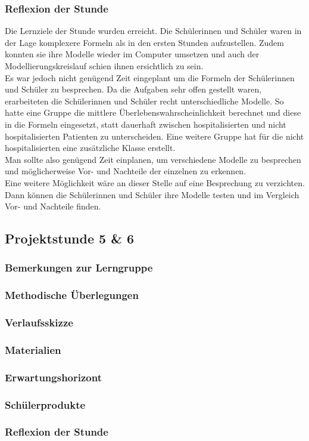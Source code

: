 \subsubsection{Reflexion der Stunde}
Die Lernziele der Stunde wurden erreicht. Die Schülerinnen und Schüler waren in der Lage komplexere Formeln als in den ersten Stunden aufzustellen. Zudem konnten sie ihre Modelle wieder im Computer umsetzen und auch der Modellierungskreislauf schien ihnen ersichtlich zu sein.\\
Es war jedoch nicht genügend Zeit eingeplant um die Formeln der Schülerinnen und Schüler zu besprechen. Da die Aufgaben sehr offen gestellt waren, erarbeiteten die Schülerinnen und Schüler recht unterschiedliche Modelle. So hatte eine Gruppe die mittlere Überlebenswahrscheinlichkeit berechnet und diese in die Formeln eingesetzt, statt dauerhaft zwischen hospitalisierten und nicht hospitalisierten Patienten zu unterscheiden. Eine weitere Gruppe hat für die nicht hospitalisierten eine zusätzliche Klasse erstellt.\\
Man sollte also genügend Zeit einplanen, um verschiedene Modelle zu besprechen und möglicherweise Vor- und Nachteile der einzelnen zu erkennen.\\
Eine weitere Möglichkeit wäre an dieser Stelle auf eine Besprechung zu verzichten. Dann können die Schülerinnen und Schüler ihre Modelle testen und im Vergleich Vor- und Nachteile finden. \\

\newpage
\subsection{Projektstunde 5 \& 6}\steffen
\subsubsection{Bemerkungen zur Lerngruppe}
\subsubsection{Methodische Überlegungen}
\subsubsection{Verlaufsskizze}
\subsubsection{Materialien}
\subsubsection{Erwartungshorizont}
\subsubsection{Schülerprodukte}
\subsubsection{Reflexion der Stunde}